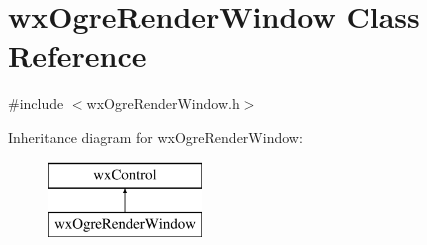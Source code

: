 \hypertarget{classwx_ogre_render_window}{}\section{wx\+Ogre\+Render\+Window Class Reference}
\label{classwx_ogre_render_window}


{\ttfamily \#include $<$wx\+Ogre\+Render\+Window.\+h$>$}

Inheritance diagram for wx\+Ogre\+Render\+Window\+:\begin{figure}[H]
\begin{center}
\leavevmode
\includegraphics[height=2.000000cm]{classwx_ogre_render_window}
\end{center}
\end{figure}
